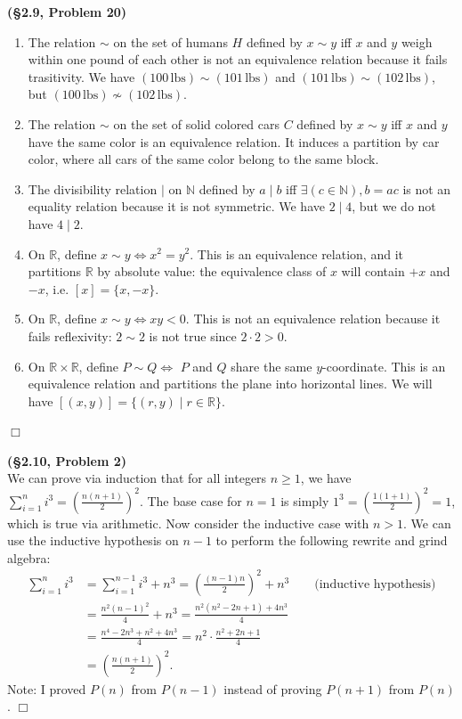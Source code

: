 \documentclass[12pt]{article}
\theoremstyle{definition}
\newenvironment{Solution}{\noindent {\sc Solution.}}{$\Box$ \vspace{2 ex}}
\begin{document}
\vspace{0.5cm}

\begin{Solution}
{\bf (\S2.9, Problem 20)}\\
\begin{enumerate}
    \item The relation $\sim$ on the set of humans $H$ defined by $x\sim y$ iff $x$ and $y$ weigh within one pound of each other is not an equivalence relation because it fails trasitivity. We have $(100\,\text{lbs})\sim (101\,\text{lbs})$ and $(101\,\text{lbs})\sim (102\,\text{lbs})$, but $(100\,\text{lbs})\not\sim (102\,\text{lbs})$.
    \item The relation $\sim$ on the set of solid colored cars $C$ defined by $x\sim y$ iff $x$ and $y$ have the same color is an equivalence relation. It induces a partition by car color, where all cars of the same color belong to the same block.
    \item The divisibility relation $\mid$ on $\mathbb N$ defined by $a\mid b$ iff $\exists (c\in \mathbb N), b=ac$ is not an equality relation because it is not symmetric. We have $2\mid 4$, but we do not have $4\mid 2$.
    \item On $\mathbb R$, define $x \sim y \iff x^2 = y^2$. This is an equivalence relation, and it partitions $\mathbb R$ by absolute value: the equivalence class of $x$ will contain $+x$ and $-x$, i.e. $[x]=\{x,-x\}$.
    \item On $\mathbb R$, define $x \sim y \iff xy < 0$. This is not an equivalence relation because it fails reflexivity: $2\sim 2$ is not true since $2\cdot 2 >0$.
    \item On $\mathbb R \times \mathbb R$, define $P\sim Q \iff$ $P$ and $Q$ share the same $y$-coordinate. This is an equivalence relation and partitions the plane into horizontal lines. We will have $[(x,y)]=\{(r,y) \mid r\in \mathbb R\}$.
\end{enumerate}
\end{Solution}

\vspace{0.5cm}

\begin{Solution}
{\bf (\S2.10, Problem 2)}\\
We can prove via induction that for all integers $n\ge 1$, we have $\sum_{i=1}^n i^3 =\left(\frac{n(n+1)}{2}\right)^2$. The base case for $n=1$ is simply $1^3 = \left( \frac{1(1+1)}{2}\right)^2 = 1$, which is true via arithmetic. Now consider the inductive case with $n > 1$. We can use the inductive hypothesis on $n-1$ to perform the following rewrite and grind algebra:
\begin{align*}
    \sum_{i=1}^n i^3 &= \sum_{i=1}^{n-1} i^3 + n^3=\left(\frac{(n-1)n}{2}\right)^2+n^3 \qquad \text{(inductive hypothesis)} \\
    &=\frac{n^2(n-1)^2}{4} +n^3= \frac{n^2(n^2-2n+1)+4n^3}{4} \\ &= \frac{n^4-2n^3+n^2+4n^3}{4} = n^2\cdot \frac{n^2+2n+1}{4}  \\ &= \left(\frac{n(n+1)}{2}\right)^2.
\end{align*}
Note: I proved $P(n)$ from $P(n-1)$ instead of proving $P(n+1)$ from $P(n)$. \end{Solution}
\end{document}
